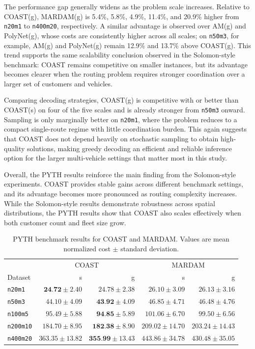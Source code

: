 \documentclass[letterpaper]{article}
\begin{document}
The performance gap generally widens as the problem scale increases. Relative to COAST(g), MARDAM(g) is 5.4\%, 5.8\%, 4.9\%, 11.4\%, and 20.9\% higher from \texttt{n20m1} to \texttt{n400m20}, respectively. A similar advantage is observed over AM(g) and PolyNet(g), whose costs are consistently higher across all scales; on \texttt{n50m3}, for example, AM(g) and PolyNet(g) remain 12.9\% and 13.7\% above COAST(g). This trend supports the same scalability conclusion observed in the Solomon-style benchmark: COAST remains competitive on smaller instances, but its advantage becomes clearer when the routing problem requires stronger coordination over a larger set of customers and vehicles.

Comparing decoding strategies, COAST(g) is competitive with or better than COAST(s) on four of the five scales and is already stronger from \texttt{n50m3} onward. Sampling is only marginally better on \texttt{n20m1}, where the problem reduces to a compact single-route regime with little coordination burden. This again suggests that COAST does not depend heavily on stochastic sampling to obtain high-quality solutions, making greedy decoding an efficient and reliable inference option for the larger multi-vehicle settings that matter most in this study.

Overall, the PYTH results reinforce the main finding from the Solomon-style experiments. COAST provides stable gains across different benchmark settings, and its advantage becomes more pronounced as routing complexity increases. While the Solomon-style results demonstrate robustness across spatial distributions, the PYTH results show that COAST also scales effectively when both customer count and fleet size grow.

\begin{table}[t]
\centering
{\small
\setlength{\tabcolsep}{2pt}
\begin{tabular}{lrrrr}
\toprule
& \multicolumn{2}{c}{COAST} & \multicolumn{2}{c}{MARDAM} \\
Dataset & s & g & s & g \\
\midrule
\texttt{n20m1} & $\textbf{24.72}\pm2.40$ & $24.78\pm2.38$ & $26.10\pm3.09$ & $26.13\pm3.16$ \\
\texttt{n50m3} & $44.10\pm4.09$ & $\textbf{43.92}\pm4.09$ & $46.85\pm4.71$ & $46.48\pm4.76$ \\
\texttt{n100m5} & $95.49\pm5.88$ & $\textbf{94.85}\pm5.89$ & $101.06\pm6.70$ & $99.50\pm6.56$ \\
\texttt{n200m10} & $184.70\pm8.95$ & $\textbf{182.38}\pm8.90$ & $209.02\pm14.70$ & $203.24\pm14.43$ \\
\texttt{n400m20} & $363.35\pm13.82$ & $\textbf{355.99}\pm13.43$ & $443.86\pm34.78$ & $430.48\pm35.05$ \\
\bottomrule
\end{tabular}
}
\caption{PYTH benchmark results for COAST and MARDAM. Values are mean normalized cost $\pm$ standard deviation.}
\label{tab:pyth_benchmark}
\end{table}
\end{document}
